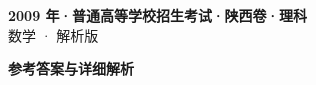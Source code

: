 \documentclass[zihao=-4, a4paper]{ctexart}
\begin{document}
\begin{center}
  {\Large\bfseries 2009 年·普通高等学校招生考试·陕西卷·理科}\\[4pt]
  {\large 数学 · 解析版}
\end{center}
\medskip
{}

\clearpage
{}
\begin{center}{\Large\bfseries 参考答案与详细解析}\end{center}
\medskip

\end{document}
